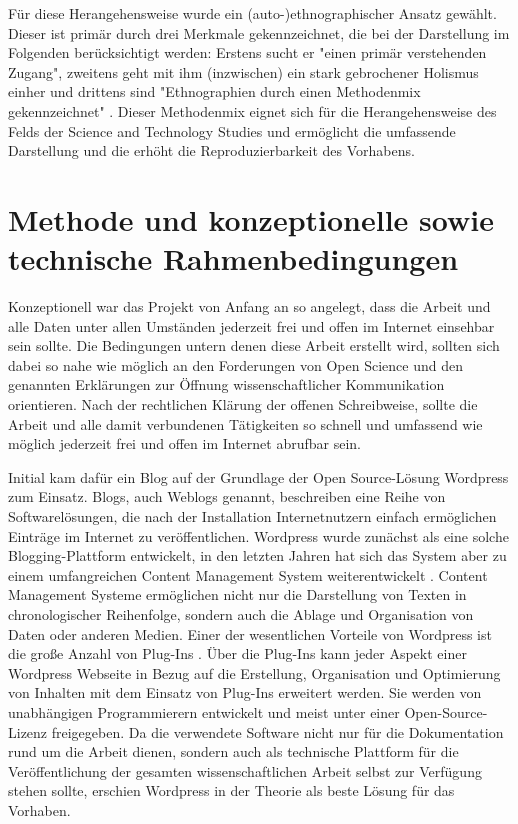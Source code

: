 Für diese Herangehensweise wurde ein (auto-)ethnographischer Ansatz gewählt. Dieser ist primär durch drei Merkmale gekennzeichnet, die bei der Darstellung im Folgenden berücksichtigt werden:  Erstens sucht er  "einen primär verstehenden Zugang", zweitens geht mit ihm (inzwischen) ein stark gebrochener Holismus einher und drittens sind "Ethnographien durch einen Methodenmix gekennzeichnet" \cite{bachmann_2011_ethnographie}. Dieser Methodenmix eignet sich für die Herangehensweise des Felds der Science and Technology Studies und ermöglicht die umfassende Darstellung und die erhöht die Reproduzierbarkeit des Vorhabens.

\section{Methode und konzeptionelle sowie technische Rahmenbedingungen}

Konzeptionell war das Projekt von Anfang an so angelegt, dass die Arbeit und alle Daten unter allen Umständen jederzeit frei und offen im Internet einsehbar sein sollte. Die Bedingungen untern denen diese Arbeit erstellt wird, sollten sich dabei so nahe wie möglich an den Forderungen von Open Science und den genannten Erklärungen zur Öffnung wissenschaftlicher Kommunikation orientieren. Nach der rechtlichen Klärung der offenen Schreibweise, sollte die Arbeit und alle damit verbundenen Tätigkeiten so schnell und umfassend wie möglich jederzeit frei und offen im Internet abrufbar sein.

Initial kam dafür ein Blog auf der Grundlage der Open Source-Lösung Wordpress zum Einsatz. Blogs, auch Weblogs genannt, beschreiben eine Reihe von Softwarelösungen, die nach der Installation Internetnutzern einfach ermöglichen Einträge im Internet zu veröffentlichen. Wordpress wurde zunächst als eine solche Blogging-Plattform entwickelt, in den letzten Jahren hat sich das System aber zu einem umfangreichen Content Management System weiterentwickelt \cite{Patel_2011_cms}. Content Management Systeme ermöglichen nicht nur die Darstellung von Texten in chronologischer Reihenfolge, sondern auch die Ablage und Organisation von Daten oder anderen Medien. Einer der wesentlichen Vorteile von Wordpress ist die große Anzahl von Plug-Ins \cite{Patel_2011_cms}. Über die Plug-Ins kann jeder Aspekt einer Wordpress Webseite in Bezug auf die Erstellung, Organisation und Optimierung von Inhalten mit dem Einsatz von Plug-Ins erweitert werden. Sie werden von unabhängigen Programmierern entwickelt und meist unter einer Open-Source-Lizenz freigegeben. Da die verwendete Software nicht nur für die Dokumentation rund um die Arbeit dienen, sondern auch als technische Plattform für die Veröffentlichung der gesamten wissenschaftlichen Arbeit selbst zur Verfügung stehen sollte, erschien Wordpress in der Theorie als beste Lösung \cite{Jones_2013_CMS} für das Vorhaben.

